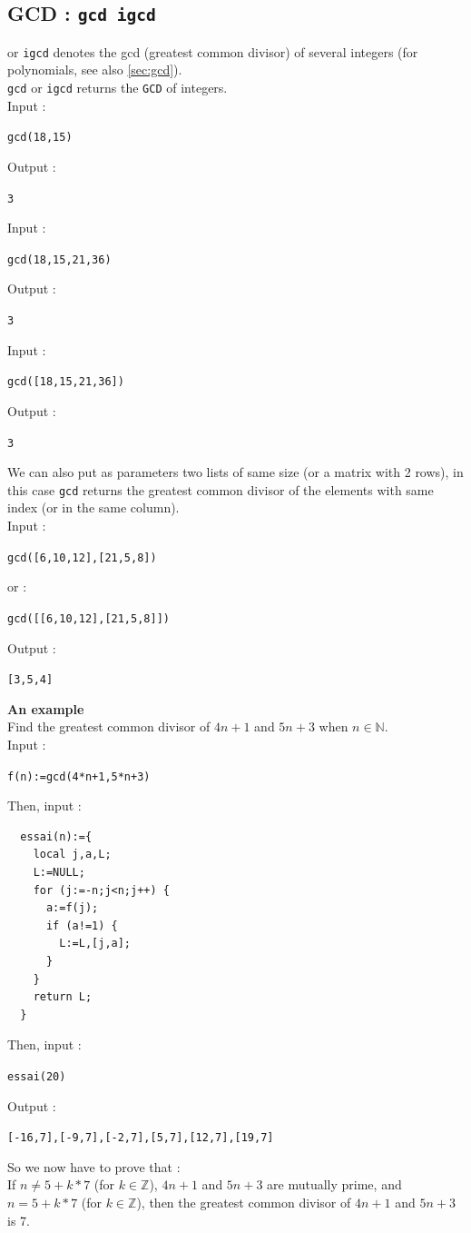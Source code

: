 \documentclass[a4paper,11pt]{book}
\begin{document}
\subsection{GCD : {\tt gcd igcd}}\label{sec:igcd}
 or {\tt igcd} denotes the gcd (greatest common divisor)
of several integers (for polynomials, see also \ref{sec:gcd}).\\ 
{\tt gcd} or {\tt igcd} returns the {\tt GCD} of integers.\\
Input :
\begin{center}{\tt gcd(18,15)}\end{center}
Output :
\begin{center}{\tt 3}\end{center} 
Input :
\begin{center}{\tt  gcd(18,15,21,36) }\end{center}
Output :
\begin{center}{\tt 3}\end{center}
Input :
\begin{center}{\tt  gcd([18,15,21,36])}\end{center}
Output :
\begin{center}{\tt 3}\end{center}
We can also put as parameters two lists of same size (or a matrix with 2 
rows), in this case {\tt  gcd} returns the greatest common divisor of
the elements with same index (or in the same column).\\
Input :
\begin{center}{\tt  gcd([6,10,12],[21,5,8])}\end{center}
or :
\begin{center}{\tt  gcd([[6,10,12],[21,5,8]])}\end{center}
Output :
\begin{center}{\tt [3,5,4]}\end{center}
{\bf An example}\\
Find the greatest common divisor of $4n+1$ and $5n+3$ when $n \in \mathbb N$.\\
Input :\\
\begin{center}{\tt  f(n):=gcd(4*n+1,5*n+3)}\end{center}
Then, input :\\
\begin{verbatim}
  essai(n):={
    local j,a,L; 
    L:=NULL;
    for (j:=-n;j<n;j++) {
      a:=f(j);
      if (a!=1) {
        L:=L,[j,a];
      } 
    }
    return L;
  }
\end{verbatim} 
Then, input :\\
\begin{center}{\tt essai(20)}\end{center}
Output :
\begin{center}{\tt [-16,7],[-9,7],[-2,7],[5,7],[12,7],[19,7]}\end{center}
So we now have to prove that :\\
If $n\not=5+k*7$ (for $k \in \mathbb Z$), $4n+1$ and $5n+3$ are mutually prime,
and $n=5+k*7$ (for $k \in \mathbb Z$), then the greatest common divisor of  $4n+1$ 
and $5n+3$ is 7.
\end{document}
